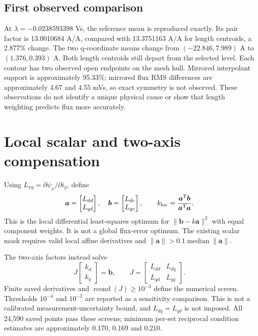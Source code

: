 \documentclass[11pt,a4paper]{article}
\begin{document}
\subsection{First observed comparison}
At $\lambda=-0.0238593398$ Vs, the reference mean is reproduced exactly. Its pair factor is 13.0010684 A/A, compared with 13.3751163 A/A for length centroids, a 2.877\% change. The two q-coordinate means change from $(-22.846,7.989)$ A to $(1.376,0.393)$ A. Both length centroids still depart from the selected level. Each contour has two observed open endpoints on the mesh hull. Mirrored interpolant support is approximately 95.33\%; mirrored flux RMS differences are approximately 4.67 and 4.55 mVs, so exact symmetry is not observed. These observations do not identify a unique physical cause or show that length weighting predicts flux more accurately.

\section{Local scalar and two-axis compensation}
Using $L_{xy}=\partial\psi_x/\partial i_y$, define
\begin{equation}
\bm a=\begin{bmatrix}L_{dd}\\L_{qd}\end{bmatrix},\quad
\bm b=\begin{bmatrix}L_{de}\\L_{qe}\end{bmatrix},\qquad
k_{\rm loc}=\frac{\bm a^\mathsf T\bm b}{\bm a^\mathsf T\bm a}.
\end{equation}
This is the local differential least-squares optimum for $\|\bm b-k\bm a\|^2$ with equal component weights. It is not a global flux-error optimum. The existing scalar mask requires valid local affine derivatives and $\|\bm a\|>0.1\operatorname{median}\|\bm a\|$.

The two-axis factors instead solve
\begin{equation}
J\begin{bmatrix}k_d\\k_q\end{bmatrix}=\bm b,\qquad
J=\begin{bmatrix}L_{dd}&L_{dq}\\L_{qd}&L_{qq}\end{bmatrix}.
\end{equation}
Finite saved derivatives and $\operatorname{rcond}(J)\ge10^{-3}$ define the numerical screen. Thresholds $10^{-4}$ and $10^{-2}$ are reported as a sensitivity comparison. This is not a calibrated measurement-uncertainty bound, and $L_{dq}=L_{qd}$ is not imposed. All 24,590 saved points pass these screens; minimum per-set reciprocal condition estimates are approximately 0.170, 0.169 and 0.210.
\end{document}
